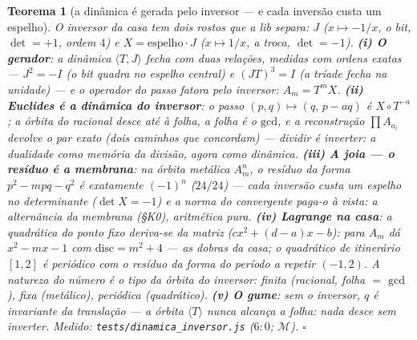 \documentclass[11pt,a4paper]{article}
\newtheorem{teorema}{Teorema}
\newcommand{\code}[1]{\texttt{\small #1}}
\begin{document}
\begin{teorema}[a dinâmica é gerada pelo inversor --- e cada inversão
custa um espelho]\label{thm:dinamica-inversor}
O inversor da casa tem dois rostos que a lib separa: $J$ ($x\mapsto
-1/x$, o bit, $\det=+1$, ordem $4$) e $X=\mathrm{espelho}\cdot J$
($x\mapsto 1/x$, a troca, $\det=-1$). \textbf{(i) O gerador}: a
dinâmica $\langle T,J\rangle$ fecha com \emph{duas} relações, medidas
com ordens exatas --- $J^{2}=-I$ (o bit quadra no espelho central) e
$(JT)^{3}=I$ (a tríade fecha na unidade) --- e o operador do passo \emph{fatora}
pelo inversor: $A_{m}=T^{m}X$. \textbf{(ii) Euclides é a dinâmica do
inversor}: o passo $(p,q)\mapsto(q,\,p-aq)$ é $X\circ T^{-a}$; a
órbita do racional desce até à folha, \emph{a folha é o
$\mathrm{gcd}$}, e a reconstrução $\prod A_{a_{i}}$ devolve o par
exato (dois caminhos que concordam) --- dividir é inverter: a
dualidade como memória da divisão, agora como dinâmica.
\textbf{(iii) A joia --- o resíduo é a membrana}: na órbita metálica
$A_{m}^{n}$, o resíduo da forma $p^{2}-mpq-q^{2}$ é
\emph{exatamente} $(-1)^{n}$ ($24/24$) --- cada inversão custa um
espelho no determinante ($\det X=-1$) e a norma do convergente
paga-o à vista: a alternância da membrana (\S K0), aritmética pura.
\textbf{(iv) Lagrange na casa}: a quadrática do ponto fixo
\emph{deriva-se da matriz} ($cx^{2}+(d-a)x-b$): para $A_{m}$ dá
$x^{2}-mx-1$ com $\mathrm{disc}=m^{2}+4$ --- \emph{as dobras da
casa}; o quadrático de itinerário $[1,2]$ é periódico com o resíduo
da forma do período a repetir $(-1,2)$. A natureza do número \emph{é}
o tipo da órbita do inversor: finita (racional, folha $=$
$\mathrm{gcd}$), fixa (metálico), periódica (quadrático). \textbf{(v)
O gume}: sem o inversor, $q$ é invariante da translação --- a órbita
$\langle T\rangle$ nunca alcança a folha: \emph{nada desce sem
inverter}.
\emph{Medido:} \code{tests/dinamica\_inversor.js} ($6{:}0$;
$\mathcal{M}$).
$\square$
\end{teorema}
\end{document}

